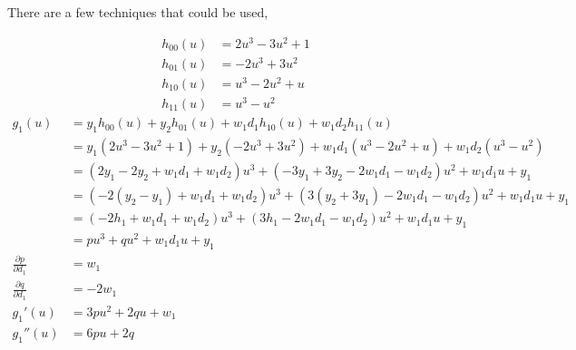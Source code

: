 \documentclass{article}
\begin{document}
There are a few techniques that could be used,

\newcommand{\dx}{\, \mathrm{d}x}
\newcommand{\du}{\, \mathrm{d}u}
\newcommand{\ddx}[1]{\frac{\mathrm{d}#1}{\mathrm{d}x}}

\newpage
\begin{align*}
  h_{00}(u)
  &= 2u^3-3u^2+1 \\
  h_{01}(u)
  &= -2u^3+3u^2 \\
  h_{10}(u)
  &= u^3-2u^2+u \\
  h_{11}(u)
  &= u^3-u^2
\end{align*}
\begin{align*}
  g_1(u)
  &= y_1h_{00}(u)+y_2h_{01}(u)+w_1d_1h_{10}(u)+w_1d_2h_{11}(u) \\
  &= y_1(2u^3-3u^2+1)+y_2(-2u^3+3u^2)+w_1d_1(u^3-2u^2+u)+w_1d_2(u^3-u^2) \\
  &= (2y_1-2y_2+w_1d_1+w_1d_2)u^3+(-3y_1+3y_2-2w_1d_1-w_1d_2)u^2+w_1d_1u+y_1 \\
  &= (-2(y_2-y_1)+w_1d_1+w_1d_2)u^3+(3(y_2+3y_1)-2w_1d_1-w_1d_2)u^2+w_1d_1u+y_1 \\
  &= (-2h_1+w_1d_1+w_1d_2)u^3+(3h_1-2w_1d_1-w_1d_2)u^2+w_1d_1u+y_1 \\
  &= pu^3+qu^2+w_1d_1u+y_1 \\
  \frac{\partial p}{\partial d_1}
  &= w_1 \\
  \frac{\partial q}{\partial d_1}
  &= -2w_1 \\
  g_1'(u)
  &= 3pu^2+2qu+w_1 \\
  g_1''(u)
  &= 6pu+2q
\end{align*}
\end{document}
